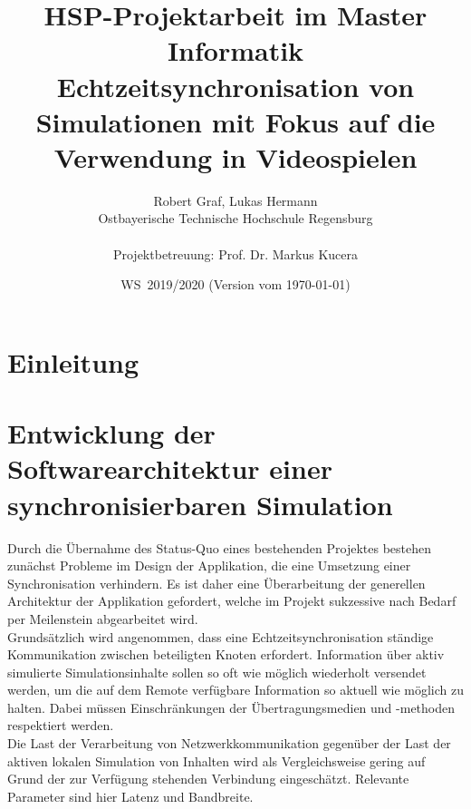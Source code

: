 \documentclass[11pt,twoside,a4paper]{article}
\begin{document}
\title{HSP-Projektarbeit im Master Informatik \\
\small Echtzeitsynchronisation von Simulationen mit Fokus auf die Verwendung in Videospielen}
\author{Robert Graf, Lukas Hermann\\
  Ostbayerische Technische Hochschule Regensburg\\
  \\
  Projektbetreuung: Prof. Dr. Markus Kucera
}
  
\date{WS\, 2019/2020 (Version vom \today)}

\maketitle

\newpage
\tableofcontents
\newpage



\section{Einleitung}


\section{Entwicklung der Softwarearchitektur einer synchronisierbaren Simulation}
Durch die Übernahme des Status-Quo eines bestehenden Projektes bestehen zunächst Probleme im Design der Applikation, die eine Umsetzung einer Synchronisation verhindern. Es ist daher eine Überarbeitung der generellen Architektur der Applikation gefordert, welche im Projekt sukzessive nach Bedarf per Meilenstein abgearbeitet wird.\\
Grundsätzlich wird angenommen, dass eine Echtzeitsynchronisation ständige Kommunikation zwischen beteiligten Knoten erfordert.
Information über aktiv simulierte Simulationsinhalte sollen so oft wie möglich wiederholt versendet werden, um die auf dem Remote verfügbare Information so aktuell wie möglich zu halten. Dabei müssen Einschränkungen der Übertragungsmedien und -methoden respektiert werden.\\
Die Last der Verarbeitung von Netzwerkkommunikation gegenüber der Last der aktiven lokalen Simulation von Inhalten wird als Vergleichsweise gering auf Grund der zur Verfügung stehenden Verbindung eingeschätzt. Relevante Parameter sind hier Latenz und Bandbreite.
\end{document}
